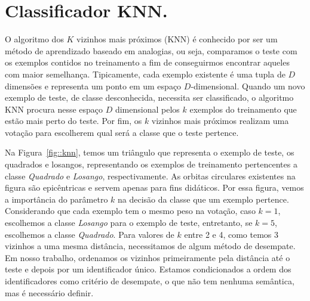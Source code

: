 
\section{Classificador \textsc{KNN}.}
\label{subsec::cred_knn}


O algoritmo dos $K$ vizinhos mais próximos (\textsc{KNN}) é conhecido por ser um método de aprendizado baseado em analogias, ou seja, comparamos o teste com os exemplos contidos no treinamento a fim de conseguirmos encontrar aqueles com maior semelhança. 
Tipicamente, cada exemplo existente é uma tupla de $D$ dimensões e representa um ponto em um espaço $D$-dimensional. 
Quando um novo exemplo de teste, de classe desconhecida, necessita ser classificado, o algoritmo \textsc{KNN} procura nesse espaço $D$ dimensional pelos $k$ exemplos do treinamento que estão mais perto do teste. 
Por fim, os $k$ vizinhos mais próximos realizam uma votação para escolherem qual será a classe que o teste pertence.

Na Figura~\ref{fig::knn}, temos um triângulo que representa o exemplo de teste, os quadrados e losangos, representando os exemplos de treinamento pertencentes a classe \textit{Quadrado} e \textit{Losango}, respectivamente. As orbitas circulares existentes na figura são epicêntricas e servem apenas para fins didáticos.
Por essa figura, vemos a importância do parâmetro $k$ na decisão da classe que um exemplo pertence. Considerando que cada exemplo tem o mesmo peso na votação, caso $k=1$, escolhemos a classe \textit{Losango} para o exemplo de teste, entretanto, se $k=5$, escolhemos a classe \textit{Quadrado}. Para valores de $k$ entre 2 e 4, como temos 3 vizinhos a uma mesma distância, necessitamos de algum método de desempate. Em nosso trabalho, ordenamos os vizinhos primeiramente pela distância até o teste e depois por um identificador único. Estamos condicionados a ordem dos identificadores como critério de desempate, o que não tem nenhuma semântica, mas é necessário definir. %

